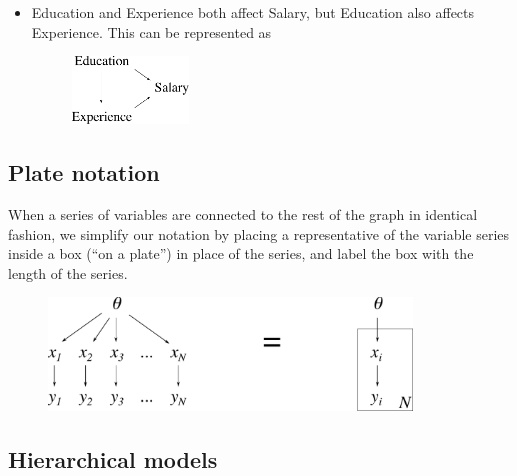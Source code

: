 \begin{itemize}
	\item Education and Experience both affect Salary, but Education also affects Experience. This can be represented as
	\begin{figure}[h!]
	\centering
		\includegraphics[height=18mm]{./figs/04-education-salary.pdf} 
	\end{figure}
\end{itemize}

\subsection{Plate notation}
When a series of variables are connected to the rest of the graph in identical fashion, we simplify our notation by placing a representative of the variable series inside a box (``on a plate'') in place of the series, and label the box with the length of the series.
\begin{figure}[h!]
\centering
	\includegraphics[height=30mm]{./figs/04-plate-notation.pdf}
\end{figure}

\newpage
\subsection{Hierarchical models}

